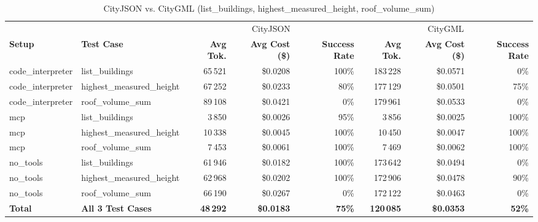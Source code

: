 \begin{table}[H]
\centering
\scriptsize
\caption{CityJSON vs. CityGML (list\_buildings, highest\_measured\_height, roof\_volume\_sum)}
\begin{tabular}{l l r r r | r r r}
\toprule
& & \multicolumn{3}{c}{CityJSON} & \multicolumn{3}{c}{CityGML} \\
\cmidrule(lr){3-5} \cmidrule(lr){6-8}
\textbf{Setup} & \textbf{Test Case} & \textbf{Avg Tok.} & \textbf{Avg Cost (\$)} & \textbf{Success Rate} & \textbf{Avg Tok.} & \textbf{Avg Cost (\$)} & \textbf{Success Rate} \\
\midrule
code\_interpreter & list\_buildings & 65\,521 & \$0.0208 & 100\% & 183\,228 & \$0.0571 & 0\% \\
code\_interpreter & highest\_measured\_height & 67\,252 & \$0.0233 & 80\% & 177\,129 & \$0.0501 & 75\% \\
code\_interpreter & roof\_volume\_sum & 89\,108 & \$0.0421 & 0\% & 179\,961 & \$0.0533 & 0\% \\
\midrule
mcp & list\_buildings & 3\,850 & \$0.0026 & 95\% & 3\,856 & \$0.0025 & 100\% \\
mcp & highest\_measured\_height & 10\,338 & \$0.0045 & 100\% & 10\,450 & \$0.0047 & 100\% \\
mcp & roof\_volume\_sum & 7\,453 & \$0.0061 & 100\% & 7\,469 & \$0.0062 & 100\% \\
\midrule
no\_tools & list\_buildings & 61\,946 & \$0.0182 & 100\% & 173\,642 & \$0.0494 & 0\% \\
no\_tools & highest\_measured\_height & 62\,968 & \$0.0202 & 100\% & 172\,906 & \$0.0478 & 90\% \\
no\_tools & roof\_volume\_sum & 66\,190 & \$0.0267 & 0\% & 172\,122 & \$0.0463 & 0\% \\
\midrule
\textbf{Total} & \textbf{All 3 Test Cases} & \textbf{48\,292} & \textbf{\$0.0183} & \textbf{75\%} & \textbf{120\,085} & \textbf{\$0.0353} & \textbf{52\%} \\
\bottomrule
\end{tabular}
\end{table}
